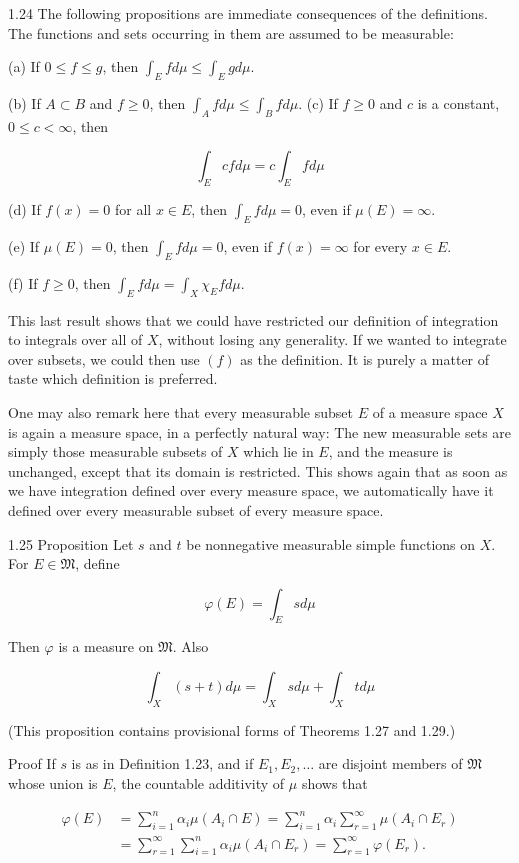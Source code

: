 \documentclass[10pt]{article}
\begin{document}
1.24 The following propositions are immediate consequences of the definitions. The functions and sets occurring in them are assumed to be measurable:

(a) If $0 \leq f \leq g$, then $\int_{E} f d \mu \leq \int_{E} g d \mu$.

(b) If $A \subset B$ and $f \geq 0$, then $\int_{A} f d \mu \leq \int_{B} f d \mu$.
(c) If $f \geq 0$ and $c$ is a constant, $0 \leq c<\infty$, then

$$
\int_{E} c f d \mu=c \int_{E} f d \mu
$$

(d) If $f(x)=0$ for all $x \in E$, then $\int_{E} f d \mu=0$, even if $\mu(E)=\infty$.

(e) If $\mu(E)=0$, then $\int_{E} f d \mu=0$, even if $f(x)=\infty$ for every $x \in E$.

(f) If $f \geq 0$, then $\int_{E} f d \mu=\int_{X} \chi_{E} f d \mu$.

This last result shows that we could have restricted our definition of integration to integrals over all of $X$, without losing any generality. If we wanted to integrate over subsets, we could then use $(f)$ as the definition. It is purely a matter of taste which definition is preferred.

One may also remark here that every measurable subset $E$ of a measure space $X$ is again a measure space, in a perfectly natural way: The new measurable sets are simply those measurable subsets of $X$ which lie in $E$, and the measure is unchanged, except that its domain is restricted. This shows again that as soon as we have integration defined over every measure space, we automatically have it defined over every measurable subset of every measure space.

1.25 Proposition Let $s$ and $t$ be nonnegative measurable simple functions on $X$. For $E \in \mathfrak{M}$, define

$$
\varphi(E)=\int_{E} s d \mu
$$

Then $\varphi$ is a measure on $\mathfrak{M}$. Also

$$
\int_{X}(s+t) d \mu=\int_{X} s d \mu+\int_{X} t d \mu
$$

(This proposition contains provisional forms of Theorems 1.27 and 1.29.)

Proof If $s$ is as in Definition 1.23, and if $E_{1}, E_{2}, \ldots$ are disjoint members of $\mathfrak{M}$ whose union is $E$, the countable additivity of $\mu$ shows that

$$
\begin{aligned}
\varphi(E) & =\sum_{i=1}^{n} \alpha_{i} \mu\left(A_{i} \cap E\right)=\sum_{i=1}^{n} \alpha_{i} \sum_{r=1}^{\infty} \mu\left(A_{i} \cap E_{r}\right) \\
& =\sum_{r=1}^{\infty} \sum_{i=1}^{n} \alpha_{i} \mu\left(A_{i} \cap E_{r}\right)=\sum_{r=1}^{\infty} \varphi\left(E_{r}\right) .
\end{aligned}
$$
\end{document}
